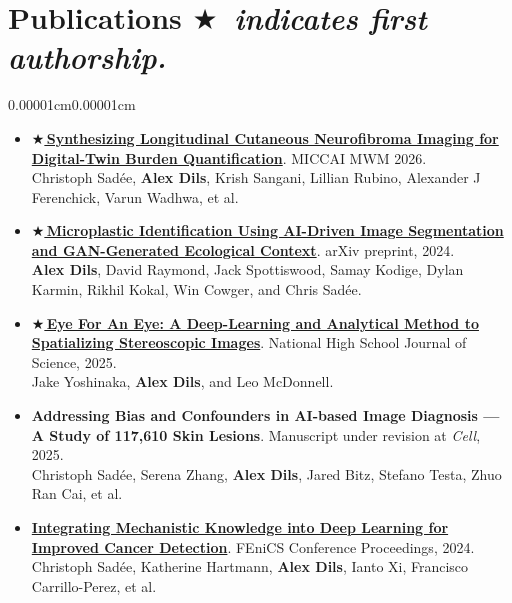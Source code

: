 \documentclass[10pt, letterpaper]{article}
\newenvironment{highlights}[1][18pt]{
  \begin{itemize}[topsep=0.04cm, parsep=0.02cm, partopsep=0pt, itemsep=0pt, leftmargin=#1]
}{
  \end{itemize}
}
\newenvironment{onecolentry}{
  \begin{adjustwidth}{0.00001cm}{0.00001cm}
}{
  \end{adjustwidth}
}
\newcommand{\firstauthor}{\ensuremath{\bigstar}}
\begin{document}
  \section{\texorpdfstring{Publications \hfill {\normalfont\itshape\footnotesize \firstauthor\ indicates first authorship.}}{Publications}}

  \begin{onecolentry}
    \begin{highlights}
      \item \fontsize{9.5pt}{10.5pt}\selectfont \href{https://openreview.net/forum?id=JI0ZzOPW9x}{\textbf{\firstauthor\,Synthesizing Longitudinal Cutaneous Neurofibroma Imaging for Digital-Twin Burden Quantification}}. MICCAI MWM 2026.\\
      Christoph Sadée, \textbf{Alex Dils}, Krish Sangani, Lillian Rubino, Alexander J Ferenchick, Varun Wadhwa, et al.
      \item \fontsize{9.5pt}{10.5pt}\selectfont \href{https://arxiv.org/abs/2410.19604}{\textbf{\firstauthor\,Microplastic Identification Using AI-Driven Image Segmentation and GAN-Generated Ecological Context}}. arXiv preprint, 2024.\\
      \textbf{Alex Dils}, David Raymond, Jack Spottiswood, Samay Kodige, Dylan Karmin, Rikhil Kokal, Win Cowger, and Chris Sadée.
      \item \fontsize{9.5pt}{10.5pt}\selectfont \href{https://nhsjs.com/2025/eye-for-an-eye-a-deep-learning-and-analytical-method-to-spatializing-stereoscopic-images/\#google_vignette}{\textbf{\firstauthor\,Eye For An Eye: A Deep-Learning and Analytical Method to Spatializing Stereoscopic Images}}. National High School Journal of Science, 2025.\\
      Jake Yoshinaka, \textbf{Alex Dils}, and Leo McDonnell.
      \item \fontsize{9.5pt}{10.5pt}\selectfont \textbf{Addressing Bias and Confounders in AI-based Image Diagnosis --- A Study of 117,610 Skin Lesions}. Manuscript under revision at \textit{Cell}, 2025.\\
      Christoph Sadée, Serena Zhang, \textbf{Alex Dils}, Jared Bitz, Stefano Testa, Zhuo Ran Cai, et al.
      \item \fontsize{9.5pt}{10.5pt}\selectfont \href{https://scientificcomputing.github.io/fenics2024/integrating-mechanistic}{\textbf{Integrating Mechanistic Knowledge into Deep Learning for Improved Cancer Detection}}. FEniCS Conference Proceedings, 2024.\\
      Christoph Sadée, Katherine Hartmann, \textbf{Alex Dils}, Ianto Xi, Francisco Carrillo-Perez, et al.
    \end{highlights}
  \end{onecolentry}
\end{document}
